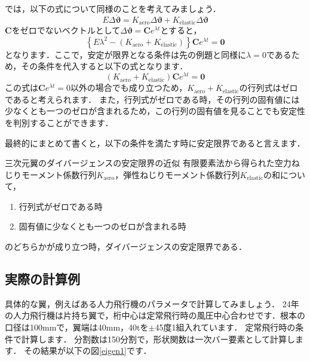 \documentclass{jarticle}
\begin{document}
では，以下の式について同様のことを考えてみましょう．
\begin{equation}
    E\Delta\ddot{\bm{\vartheta}} = K_\mathrm{aero} \Delta\bm{\vartheta} + K_\mathrm{elastic} \Delta\bm{\vartheta}
\end{equation}
$\bm{C}$をゼロでないベクトルとして$\Delta\bm{\vartheta} = \bm{C}e^{\lambda t}$とすると，
\begin{equation}
    \left\{ E\lambda^2 - (K_\mathrm{aero} + K_\mathrm{elastic}) \right\}\bm{C}e^{\lambda t} = \bm{0}
\end{equation}
となります．ここで，安定が限界となる条件は先の例題と同様に$\lambda = 0$であるため，その条件を代入すると以下の式となります．
\begin{equation}
    (K_\mathrm{aero} + K_\mathrm{elastic})\bm{C}e^{\lambda t} = \bm{0}
\end{equation}
この式は$\bm{C}e^{\lambda t}=0$以外の場合でも成り立つため，$K_\mathrm{aero} + K_\mathrm{elastic}$の行列式はゼロであると考えられます．
また，行列式がゼロである時，その行列の固有値には少なくとも一つのゼロが含まれるため，この行列の固有値を見ることでも安定性を判別することができます．

最終的にまとめて書くと，以下の条件を満たす時に安定限界であると言えます．
\begin{itembox}[l]{三次元翼のダイバージェンスの安定限界の近似}
    有限要素法から得られた空力ねじりモーメント係数行列$K_\mathrm{aero}$，弾性ねじりモーメント係数行列$K_\mathrm{elastic}$の和について，
    \begin{enumerate}
        \item 行列式がゼロである時
        \item 固有値に少なくとも一つのゼロが含まれる時
    \end{enumerate}
    のどちらかが成り立つ時，ダイバージェンスの安定限界である．
\end{itembox}


\subsection{実際の計算例}

具体的な翼，例えばある人力飛行機のパラメータで計算してみましょう．
24年の人力飛行機は片持ち翼で，桁中心は定常飛行時の風圧中心合わせです．根本の口径は100mmで，翼端は40mm，40tを$\pm$45度1組入れています．
定常飛行時の条件で計算します．
分割数は150分割で，形状関数は一次バー要素として計算します．
その結果が以下の図\ref{eigen1}です．
\end{document}
